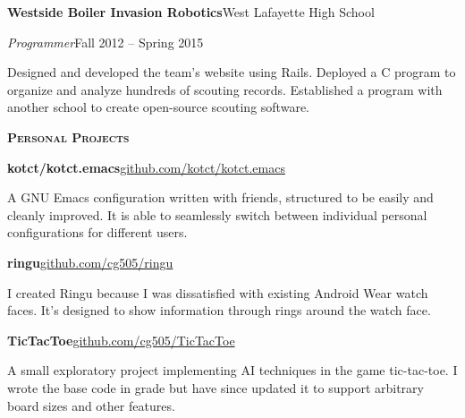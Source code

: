 \documentclass[11pt]{article}
\newcommand{\sectionfont}{\Large\scshape\bfseries\color{cg505green}}
\begin{document}
\begin{minipage}[t]{0.67\textwidth}
  \textbf{Westside Boiler Invasion Robotics}\hfill West Lafayette High School
  \begin{adjustwidth}{10pt}{}
    \emph{Programmer}\hfill Fall 2012 -- Spring 2015

    Designed and developed the team's website using Rails.
    Deployed a C program to organize and analyze hundreds of scouting records.
    Established a program with another school to create open-source scouting software.
  \end{adjustwidth}

  \vspace{5pt}

  {\sectionfont Personal Projects}

  \textbf{kotct/kotct.emacs}\hfill\href{https://github.com/kotct/kotct.emacs/}{github.com/kotct/kotct.emacs}
  \begin{adjustwidth}{10pt}{}
    A GNU Emacs configuration written with friends, structured to be easily and cleanly improved.
    It is able to seamlessly switch between individual personal configurations for different users.
  \end{adjustwidth}

  \textbf{ringu}\hfill\href{https://github.com/cg505/ringu/}{github.com/cg505/ringu}
  \begin{adjustwidth}{10pt}{}
    I created Ringu because I was dissatisfied with existing Android Wear watch faces.
    It's designed to show information through rings around the watch face.
  \end{adjustwidth}

  \textbf{TicTacToe}\hfill\href{https://github.com/cg505/TicTacToe/}{github.com/cg505/TicTacToe}
  \begin{adjustwidth}{10pt}{}
    A small exploratory project implementing AI techniques in the game tic-tac-toe.
    I wrote the base code in  grade but have since updated it to support arbitrary board sizes and other features.
  \end{adjustwidth}
\end{minipage}
\end{document}
